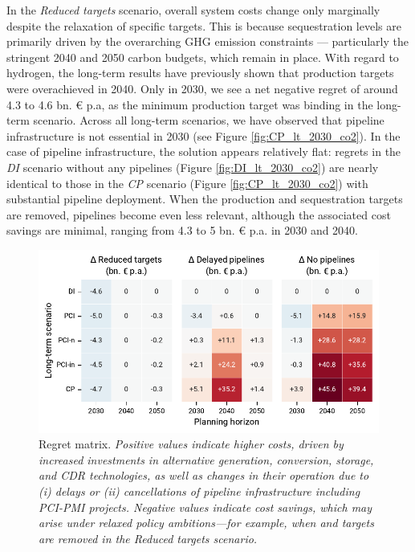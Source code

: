 \documentclass[final,5p,times,twocolumn,sort&compress]{elsarticle}
\begin{document}
In the \textit{Reduced targets} scenario, overall system costs change only marginally despite the relaxation of specific targets. This is because  sequestration levels are primarily driven by the overarching GHG emission constraints --- particularly the stringent 2040 and 2050 carbon budgets, which remain in place. With regard to hydrogen, the long-term results have previously shown that  production targets were overachieved in 2040. Only in 2030, we see a net negative regret of around 4.3 to 4.6 bn. \euro{} p.a, as the minimum  production target was binding in the long-term scenario. Across all long-term scenarios, we have observed that 
 pipeline infrastructure is not essential in 2030 (see Figure \ref{fig:CP_lt_2030_co2}). In the case of  pipeline infrastructure, the solution appears relatively flat: regrets in the \textit{DI} scenario without any pipelines (Figure \ref{fig:DI_lt_2030_co2}) are nearly identical to those in the \textit{CP} scenario (Figure \ref{fig:CP_lt_2030_co2}) with substantial pipeline deployment. When the  production and  sequestration targets are removed, pipelines become even less relevant, although the associated cost savings are minimal, ranging from 4.3 to 5 bn. \euro{} p.a. in 2030 and 2040.

\begin{figure}[htbp]
  \centering
  \includegraphics[width=\linewidth]{regret_matrix}
  \caption{Regret matrix. \textit{Positive values indicate higher costs, driven by increased investments in alternative generation, conversion, storage, and CDR technologies, as well as changes in their operation due to (i) delays or (ii) cancellations of pipeline infrastructure including PCI-PMI projects. Negative values indicate cost savings, which may arise under relaxed policy ambitions—for example, when  and  targets are removed in the \textit{Reduced targets} scenario.}}
  \label{fig:regret_matrix_results}
\end{figure}
\end{document}
